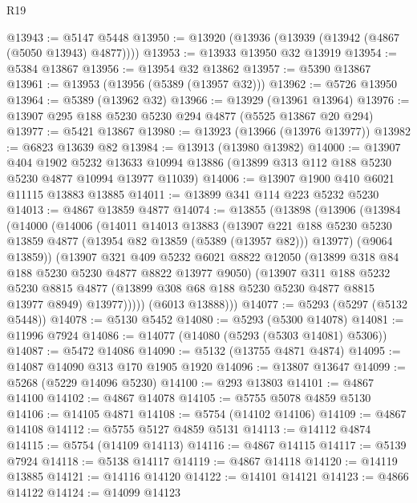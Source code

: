 \begin{lexlean}{R19}
\begin{coremodule}
@13943 := @5147 @5448
@13950 := @13920 (@13936 (@13939 (@13942 (@4867 (@5050 @13943) @4877))))
@13953 := @13933 @13950 @32 @13919
@13954 := @5384 @13867
@13956 := @13954 @32 @13862
@13957 := @5390 @13867
@13961 := @13953 (@13956 (@5389 (@13957 @32)))
@13962 := @5726 @13950
@13964 := @5389 (@13962 @32)
@13966 := @13929 (@13961 @13964)
@13976 := @13907 @295 @188 @5230 @5230 @294 @4877 (@5525 @13867 @20 @294)
@13977 := @5421 @13867
@13980 := @13923 (@13966 (@13976 @13977))
@13982 := @6823 @13639 @82
@13984 := @13913 (@13980 @13982)
@14000 := @13907
    @404
    @1902
    @5232
    @13633
    @10994
    @13886
    (@13899 @313 @112 @188 @5230 @5230 @4877 @10994 @13977 @11039)
@14006 := @13907 @1900 @410 @6021 @11115 @13883 @13885
@14011 := @13899 @341 @114 @223 @5232 @5230
@14013 := @4867 @13859 @4877
@14074 := @13855
    (@13898
      (@13906
        (@13984
          (@14000
            (@14006
              (@14011
                @14013
                @13883
                (@13907
                  @221
                  @188
                  @5230
                  @5230
                  @13859
                  @4877
                  (@13954 @82 @13859 (@5389 (@13957 @82)))
                  @13977)
                (@9064 @13859))
              (@13907
                @321
                @409
                @5232
                @6021
                @8822
                @12050
                (@13899 @318 @84 @188 @5230 @5230 @4877 @8822 @13977 @9050)
                (@13907
                  @311
                  @188
                  @5232
                  @5230
                  @8815
                  @4877
                  (@13899 @308 @68 @188 @5230 @5230 @4877 @8815 @13977 @8949)
                  @13977)))))
        (@6013 @13888)))
@14077 := @5293 (@5297 (@5132 @5448))
@14078 := @5130 @5452
@14080 := @5293 (@5300 @14078)
@14081 := @11996 @7924
@14086 := @14077 (@14080 (@5293 (@5303 @14081) @5306))
@14087 := @5472 @14086
@14090 := @5132 (@13755 @4871 @4874)
@14095 := @14087 @14090 @313 @170 @1905 @1920
@14096 := @13807 @13647
@14099 := @5268 (@5229 @14096 @5230)
@14100 := @293 @13803
@14101 := @4867 @14100
@14102 := @4867 @14078
@14105 := @5755 @5078 @4859 @5130
@14106 := @14105 @4871
@14108 := @5754 (@14102 @14106)
@14109 := @4867 @14108
@14112 := @5755 @5127 @4859 @5131
@14113 := @14112 @4874
@14115 := @5754 (@14109 @14113)
@14116 := @4867 @14115
@14117 := @5139 @7924
@14118 := @5138 @14117
@14119 := @4867 @14118
@14120 := @14119 @13885
@14121 := @14116 @14120
@14122 := @14101 @14121
@14123 := @4866 @14122
@14124 := @14099 @14123

\end{coremodule}
\end{lexlean}
